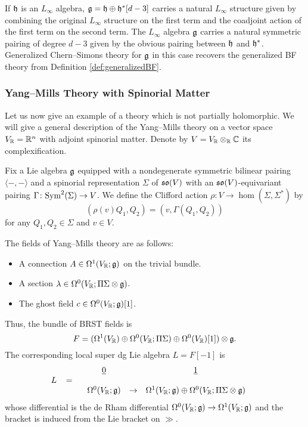 \documentclass[10pt, oneside]{article}
\begin{document}
\begin{example}
If $\mathfrak h$ is an $L_\infty$ algebra, $\mathfrak g = \mathfrak h \oplus \mathfrak h^*[d-3]$ carries a natural $L_\infty$ structure given by combining the original $L_\infty$ structure on the first term and the coadjoint action of the first term on the second term. The $L_\infty$ algebra $\mathfrak g$ carries a natural symmetric pairing of degree $d-3$ given by the obvious pairing between $\mathfrak h$ and $\mathfrak h^*$. Generalized Chern--Simons theory for $\mathfrak g$ in this case recovers the generalized BF theory from Definition \ref{def:generalizedBF}.
\end{example}

\subsubsection{Yang--Mills Theory with Spinorial Matter} \label{YM_section}

Let us now give an example of a theory which is not partially holomorphic. We will give a general description of the Yang--Mills theory on a vector space $V_\mathbb R = \mathbb R^n$ with adjoint spinorial matter. Denote by $V=V_\mathbb R\otimes_\mathbb R \mathbb C$ its complexification.

Fix a Lie algebra $\mathfrak g$ equipped with a nondegenerate symmetric bilinear pairing $\langle -, -\rangle$ and a spinorial representation $\Sigma$ of $\mathfrak{so}(V)$ with an $\mathfrak{so}(V)$-equivariant pairing $\Gamma \colon {\rm Sym}^2(\Sigma)\to V$. We define the Clifford action $\rho\colon V\rightarrow \hom(\Sigma, \Sigma^*)$ by
\begin{equation}
(\rho(v) Q_1, Q_2) = (v, \Gamma(Q_1, Q_2))
\label{eq:Gammaspinorpairing}
\end{equation}
for any $Q_1, Q_2\in\Sigma$ and $v\in V$.

The fields of Yang--Mills theory are as follows:
\begin{itemize}
\item A connection $A \in \Omega^1(V_\mathbb R; \mathfrak g)$ on the trivial bundle.

\item A section $\lambda \in \Omega^0(V_\mathbb R; \Pi \Sigma \otimes \mathfrak g)$.

\item The ghost field $c\in\Omega^0(V_\mathbb R; \mathfrak g)[1]$.
\end{itemize}

Thus, the bundle of BRST fields is
\[F = (\Omega^1(V_\mathbb R)\oplus \Omega^0(V_\mathbb R; \Pi\Sigma)\oplus \Omega^0(V_\mathbb R)[1])\otimes \mathfrak g.\]
The corresponding local super dg Lie algebra $L=F[-1]$ is
\[
L \;\;\; = \begin{array}{ccccc}
& \underline{0} & & \underline{1} & \\ 
& & & & \\
& \Omega^0(V_\mathbb R; \mathfrak{g}) & \to & \Omega^1(V_\mathbb R; \mathfrak{g}) \oplus \Omega^0(V_\mathbb R; \Pi \Sigma \otimes \mathfrak{g}) & 
\end{array}
\]
whose differential is the de Rham differential $\Omega^0(V_\mathbb R; \mathfrak{g})\rightarrow \Omega^1(V_\mathbb R; \mathfrak{g})$ and the bracket is induced from the Lie bracket on $\gg$.
\end{document}
